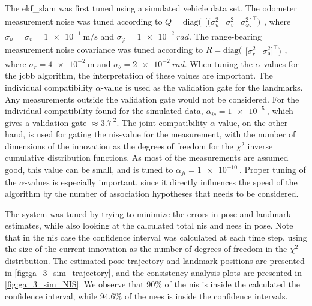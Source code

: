 The \acrshort{ekf_slam} was first tuned using a simulated vehicle data set. The odometer measurement noise was tuned according to $Q = \text{diag}(\begin{array}{ccc}[(\sigma_u^2 & \sigma_v^2 & \sigma_\varphi^2 ]^{\top})\end{array}$, where $\sigma_u = \sigma_v = \SI{1e-1}{\meter\per\second}$ and $\sigma_\varphi = \SI{1e-2}{rad}$. The range-bearing measurement noise covariance was tuned according to $R = \text{diag}(\begin{array}{cc}[\sigma_r^2 & \sigma_\theta^2 ]^{\top})\end{array}$, where $\sigma_r = \SI{4e-2}{\meter}$ and $\sigma_\theta = \SI{2e-2}{rad}$. When tuning the $\alpha$-values for the \acrshort{jcbb} algorithm, the interpretation of these values are important. The individual compatibility $\alpha$-value is used as the validation gate for the landmarks. Any measurements outside the validation gate would not be considered. For the individual compatibility found for the simulated data, $\alpha_{ic} = \SI{1e-5}{}$, which gives a validation gate $\approx \SI{3.7}{}^2$. The joint compatibility $\alpha$-value, on the other hand, is used for gating the \acrshort{nis}-value for the measurement, with the number of dimensions of the innovation as the degrees of freedom for the $\chi^2$ inverse cumulative distribution functions. As most of the measurements are assumed good, this value can be small, and is tuned to $\alpha_{ji} = \SI{1e-10}{}$. Proper tuning of the $\alpha$-values is especially important, since it directly influences the speed of the algorithm by the number of association hypotheses that needs to be considered. 

The system was tuned by trying to minimize the errors in pose and landmark estimates, while also looking at the calculated total \acrshort{nis} and \acrshort{nees} in pose. Note that in the \acrshort{nis} case the confidence interval was calculated at each time step, using the size of the current innovation as the number of degrees of freedom in the $\chi^2$ distribution. The estimated pose trajectory and landmark positions are presented in \cref{fig:ga_3_sim_trajectory}, and the consistency analysis plots are presented in \cref{fig:ga_3_sim_NIS}. We observe that 90\% of the \acrshort{nis} is inside the calculated the confidence interval, while 94.6\% of the \acrshort{nees} is inside the confidence intervals. 


